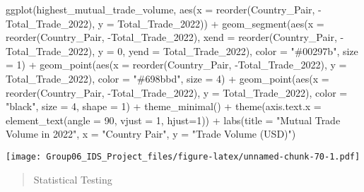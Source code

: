 \documentclass[
]{article}
\newenvironment{Shaded}{\begin{snugshade}}{\end{snugshade}}
\newcommand{\AttributeTok}[1]{\textcolor[rgb]{0.77,0.63,0.00}{#1}}
\newcommand{\DecValTok}[1]{\textcolor[rgb]{0.00,0.00,0.81}{#1}}
\newcommand{\FunctionTok}[1]{\textcolor[rgb]{0.00,0.00,0.00}{#1}}
\newcommand{\NormalTok}[1]{#1}
\newcommand{\SpecialCharTok}[1]{\textcolor[rgb]{0.00,0.00,0.00}{#1}}
\newcommand{\StringTok}[1]{\textcolor[rgb]{0.31,0.60,0.02}{#1}}
\begin{document}
\begin{Shaded}
\begin{Highlighting}[]
\FunctionTok{ggplot}\NormalTok{(highest\_mutual\_trade\_volume, }\FunctionTok{aes}\NormalTok{(}\AttributeTok{x =} \FunctionTok{reorder}\NormalTok{(Country\_Pair, }\SpecialCharTok{{-}}\NormalTok{Total\_Trade\_2022), }\AttributeTok{y =}\NormalTok{ Total\_Trade\_2022)) }\SpecialCharTok{+}
  \FunctionTok{geom\_segment}\NormalTok{(}\FunctionTok{aes}\NormalTok{(}\AttributeTok{x =} \FunctionTok{reorder}\NormalTok{(Country\_Pair, }\SpecialCharTok{{-}}\NormalTok{Total\_Trade\_2022), }\AttributeTok{xend =} \FunctionTok{reorder}\NormalTok{(Country\_Pair, }\SpecialCharTok{{-}}\NormalTok{Total\_Trade\_2022), }\AttributeTok{y =} \DecValTok{0}\NormalTok{, }\AttributeTok{yend =}\NormalTok{ Total\_Trade\_2022), }\AttributeTok{color =} \StringTok{"\#00297b"}\NormalTok{, }\AttributeTok{size =} \DecValTok{1}\NormalTok{) }\SpecialCharTok{+}
  \FunctionTok{geom\_point}\NormalTok{(}\FunctionTok{aes}\NormalTok{(}\AttributeTok{x =} \FunctionTok{reorder}\NormalTok{(Country\_Pair, }\SpecialCharTok{{-}}\NormalTok{Total\_Trade\_2022), }\AttributeTok{y =}\NormalTok{ Total\_Trade\_2022), }\AttributeTok{color =} \StringTok{"\#698bbd"}\NormalTok{, }\AttributeTok{size =} \DecValTok{4}\NormalTok{) }\SpecialCharTok{+}
  \FunctionTok{geom\_point}\NormalTok{(}\FunctionTok{aes}\NormalTok{(}\AttributeTok{x =} \FunctionTok{reorder}\NormalTok{(Country\_Pair, }\SpecialCharTok{{-}}\NormalTok{Total\_Trade\_2022), }\AttributeTok{y =}\NormalTok{ Total\_Trade\_2022), }\AttributeTok{color =} \StringTok{"black"}\NormalTok{, }\AttributeTok{size =} \DecValTok{4}\NormalTok{, }\AttributeTok{shape =} \DecValTok{1}\NormalTok{) }\SpecialCharTok{+}
  \FunctionTok{theme\_minimal}\NormalTok{() }\SpecialCharTok{+}
  \FunctionTok{theme}\NormalTok{(}\AttributeTok{axis.text.x =} \FunctionTok{element\_text}\NormalTok{(}\AttributeTok{angle =} \DecValTok{90}\NormalTok{, }\AttributeTok{vjust =} \DecValTok{1}\NormalTok{, }\AttributeTok{hjust=}\DecValTok{1}\NormalTok{)) }\SpecialCharTok{+}
  \FunctionTok{labs}\NormalTok{(}\AttributeTok{title =} \StringTok{"Mutual Trade Volume in 2022"}\NormalTok{,}
       \AttributeTok{x =} \StringTok{"Country Pair"}\NormalTok{,}
       \AttributeTok{y =} \StringTok{"Trade Volume (USD)"}\NormalTok{)}
\end{Highlighting}
\end{Shaded}

\texttt{[image: Group06\_IDS\_Project\_files/figure-latex/unnamed-chunk-70-1.pdf]}

\begin{quote}
Statistical Testing
\end{quote}
\end{document}
